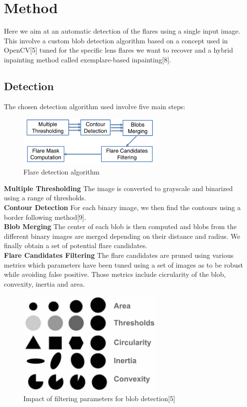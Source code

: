 \documentclass[11pt,twocolumn]{article}
\begin{document}
\section{Method}

Here we aim at an automatic detection of the flares using a single input image. This involve a custom blob detection algorithm based on a concept used in OpenCV[5] tuned for the specific lens flares we want to recover and a hybrid inpainting method called exemplare-based inpainting[8].

\subsection{Detection}

The chosen detection algorithm used involve five main steps:
\\

\begin{figure}[ht!]
\centering
\includegraphics[width=72mm]{flow_detection.png}
\caption{Flare detection algorithm}
\end{figure}

\textbf{Multiple Thresholding} The image is converted to grayscale and binarized using a range of thresholds.
\\

\textbf{Contour Detection} For each binary image, we then find the contours using a border following method[9].
\\

\textbf{Blob Merging} The center of each blob is then computed and blobs from the different binary images are merged depending on their distance and radius. We finally obtain a set of potential flare candidates.
\\

\textbf{Flare Candidates Filtering} The flare candidates are pruned using various metrics which parameters have been tuned using a set of images as to be robust while avoiding false positive. Those metrics include cicrularity of the blob, convexity, inertia and area.

\begin{figure}[ht!]
\centering
\includegraphics[width=72mm]{Filters.jpg}
\caption{Impact of filtering parameters for blob detection[5]}
\end{figure} 
\end{document}

